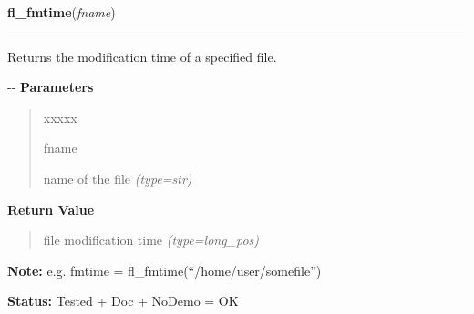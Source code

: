 \hspace{.8\funcindent}\begin{boxedminipage}{\funcwidth}

    \raggedright \textbf{fl\_fmtime}(\textit{fname})

    \vspace{-1.5ex}

    \rule{\textwidth}{0.5\fboxrule}
\setlength{\parskip}{2ex}

Returns the modification time of a specified file.

-{}-
\setlength{\parskip}{1ex}
      \textbf{Parameters}
      \vspace{-1ex}

      \begin{quote}
        \begin{Ventry}{xxxxx}

          \item[fname]


name of the file
            {\it (type=str)}

        \end{Ventry}

      \end{quote}

      \textbf{Return Value}
    \vspace{-1ex}

      \begin{quote}

file modification time
      {\it (type=long\_pos)}

      \end{quote}

\textbf{Note:} 
e.g. fmtime = fl\_fmtime(``/home/user/somefile'')


\textbf{Status:} 
Tested + Doc + NoDemo = OK


    \end{boxedminipage}

    \label{xformslib:flfilesys:fl_fix_dirname}

    \vspace{0.5ex}

